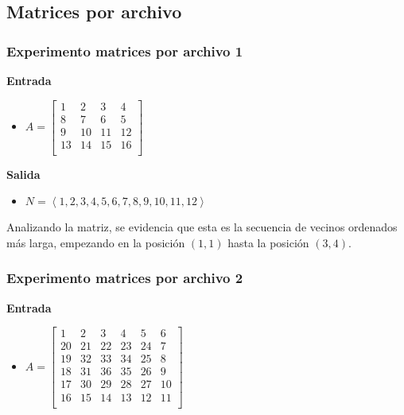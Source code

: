 \documentclass[letter]{article}
\begin{document}
\subsection{Matrices por archivo}

\subsubsection{Experimento matrices por archivo 1}

\textbf{Entrada} \par

\begin{itemize}
    \item $ A = 
        \begin{bmatrix}
         1 &  2 &  3 &  4 \\
         8 &  7 &  6 &  5 \\
         9 & 10 & 11 & 12 \\
        13 & 14 & 15 & 16 \\
        \end{bmatrix}
    $
\end{itemize}

\textbf{Salida} \par

\begin{itemize}
    \item $N = \left< 1, 2, 3, 4, 5, 6, 7, 8, 9, 10, 11, 12 \right>$
\end{itemize}

Analizando la matriz, se evidencia que esta es la secuencia de vecinos ordenados más larga, empezando en la posición $(1,1)$ hasta la posición $(3,4)$. \par

\subsubsection{Experimento matrices por archivo 2}

\textbf{Entrada} \par

\begin{itemize}
    \item $ A = 
        \begin{bmatrix}
         1 &  2 &  3 &  4 &  5 &  6 \\
        20 & 21 & 22 & 23 & 24 &  7 \\
        19 & 32 & 33 & 34 & 25 &  8 \\
        18 & 31 & 36 & 35 & 26 &  9 \\
        17 & 30 & 29 & 28 & 27 & 10 \\
        16 & 15 & 14 & 13 & 12 & 11 \\
        \end{bmatrix}
    $
\end{itemize}
\end{document}
